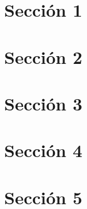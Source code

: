 \documentclass[11pt]{article}
\begin{document}
\def \universidad{FACULTAD}
\def \unidad{Trabajo Práctico N$^\circ$X}
\def \carrera{CARRERA O DEPARTAMENTO}
\def \materia{MATERIA}
\def \titulo{TITULO}
\def \logofac{preambulo/logo.png} %


\newpage

\newpage
\pagestyle{empty}
\renewcommand{\contentsname}{{\textit{\huge Índice}}} %
\tableofcontents

\newpage
\pagestyle{empty}
\renewcommand{\listfigurename}{{\textit{\huge Lista de figuras}}}
\listoffigures

\newpage
\pagestyle{fancy} %
\setcounter{page}{1} %
\seteocontadores
\section{Sección 1}
\label{sec:seccion1}


\newpage
\seteocontadores
\section{Sección 2}
\label{sec:seccion2}


\newpage
\seteocontadores
\section{Sección 3}
\label{sec:seccion3}


\newpage
\seteocontadores
\section{Sección 4}
\label{sec:seccion4}


\newpage
\seteocontadores
\section{Sección 5}
\label{sec:seccion5}

\end{document}

